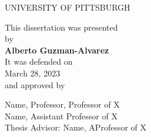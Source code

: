 
\setcounter{page}{2}

\pagestyle{plain}

\begin{center}
UNIVERSITY OF PITTSBURGH\\
\end{center}

       \vspace*{8\baselineskip}


\begin{center}
This dissertation was presented\\
by\\
       \vspace*{1\baselineskip}
\textbf{Alberto Guzman-Alvarez}\\
       \vspace*{1\baselineskip}
It was defended on\\
March 28, 2023\\
and approved by
\end{center}

\begin{center}
Name, Professor, Professor of X\\
Name, Assistant Professor of X\\
Thesis Advisor: Name, AProfessor of X\\
\end{center}

\newpage
